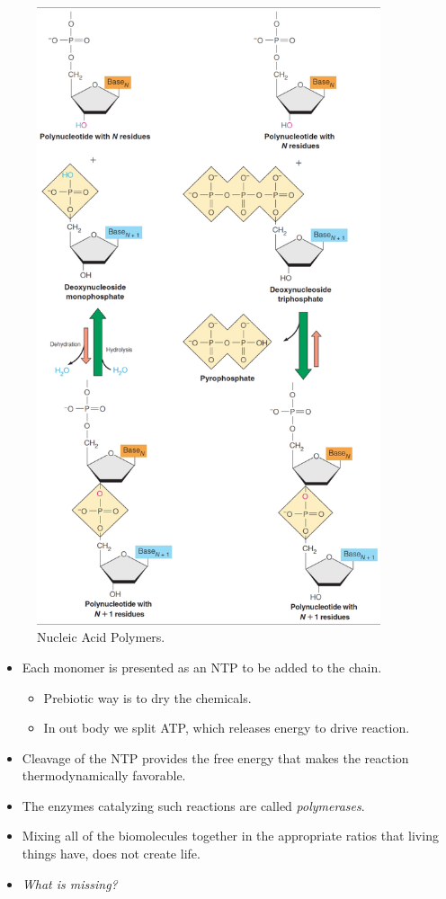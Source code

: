 \documentclass[]{article}
\begin{document}
\begin{figure}[H]
	\caption{Nucleic Acid
		Polymers.}\label{fig:NucleicAcidPolymers} 
	\includegraphics[width=0.9\textwidth]{NucleicAcidPolymers}
\end{figure}

\begin{itemize}
	\item Each monomer is presented as an NTP to be added to the chain.
	\begin{itemize}
		\item Prebiotic way is to dry the chemicals.
		\item In out body we split ATP, which releases energy to drive reaction.
	\end{itemize}
	\item Cleavage of the NTP provides the free energy that makes the reaction
	thermodynamically favorable.
	\item The enzymes catalyzing such reactions are
	called 	\textit{polymerases}.
	\item Mixing all of the biomolecules together in the
	appropriate ratios that living things have, does not
	create life.
	\item \textit{What is missing?}
\end{itemize}
\end{document}

